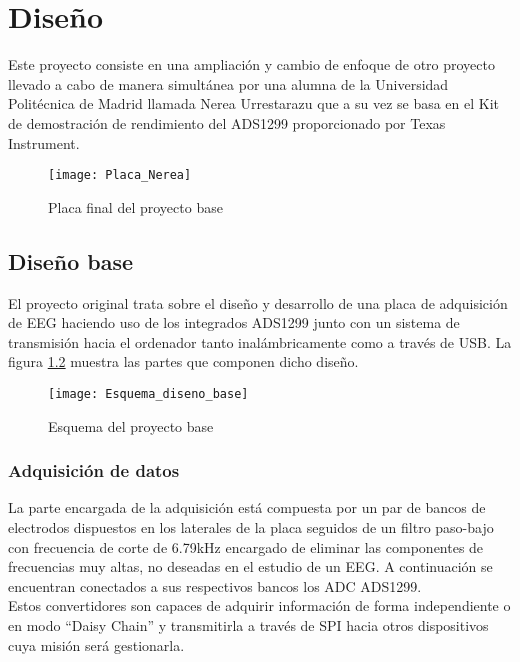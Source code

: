 \chapter{Diseño\label{sec:diseño}}

Este proyecto consiste en una ampliación y cambio de enfoque de otro proyecto llevado a cabo de manera simultánea por una alumna de la Universidad Politécnica de Madrid llamada Nerea Urrestarazu que a su vez se basa en el Kit de demostración de rendimiento del ADS1299 proporcionado por Texas Instrument.

\begin{figure} [h]
    \centering
    \texttt{[image: Placa\_Nerea]}
    \caption{Placa final del proyecto base}
    \label{fig:Placa_base}
\end{figure}

\section{Diseño base\label{sec:Diseno_base_N}}

El proyecto original trata sobre el diseño y desarrollo de una placa de adquisición de EEG haciendo uso de los integrados ADS1299 junto con un sistema de transmisión hacia el ordenador tanto inalámbricamente como a través de USB. La figura \ref{fig:Diseno_base} muestra las partes que componen dicho diseño.

\begin{figure} [h]
    \centering
    \texttt{[image: Esquema\_diseno\_base]}
    \caption{Esquema del proyecto base}
    \label{fig:Diseno_base}
\end{figure}

\subsection{Adquisición de datos\label{sec:Adquisicion_N}}

La parte encargada de la adquisición está compuesta por un par de bancos de electrodos dispuestos en los laterales de la placa seguidos de un filtro paso-bajo con frecuencia de corte de 6.79kHz encargado de eliminar las componentes de frecuencias muy altas, no deseadas en el estudio de un \acrshort{EEG}. A continuación se encuentran conectados a sus respectivos bancos los \acrshort{ADC} ADS1299. 
\\Estos convertidores son capaces de adquirir información de forma independiente o en modo ``Daisy Chain'' y transmitirla a través de \acrshort{SPI} hacia otros dispositivos cuya misión será gestionarla.

